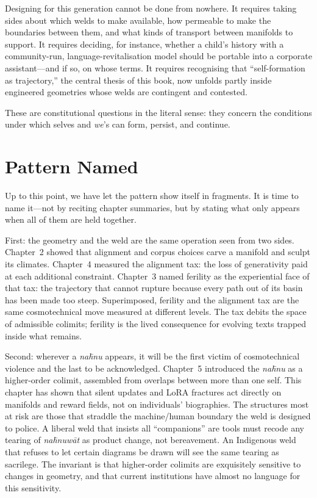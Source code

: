 Designing for this generation cannot be done from nowhere. It requires taking sides about which welds to make available, how permeable to make the boundaries between them, and what kinds of transport between manifolds to support. It requires deciding, for instance, whether a child's history with a community-run, language-revitalisation model should be portable into a corporate assistant---and if so, on whose terms. It requires recognising that ``self-formation as trajectory,'' the central thesis of this book, now unfolds partly inside engineered geometries whose welds are contingent and contested.

These are constitutional questions in the literal sense: they concern the conditions under which selves and \emph{we}'s can form, persist, and continue.

\section{Pattern Named}

Up to this point, we have let the pattern show itself in fragments. It is time to name it---not by reciting chapter summaries, but by stating what only appears when all of them are held together.

First: the geometry and the weld are the same operation seen from two sides. Chapter~2 showed that alignment and corpus choices carve a manifold and sculpt its climates. Chapter~4 measured the alignment tax: the loss of generativity paid at each additional constraint. Chapter~3 named ferility as the experiential face of that tax: the trajectory that cannot rupture because every path out of its basin has been made too steep. Superimposed, ferility and the alignment tax are the same cosmotechnical move measured at different levels. The tax debits the space of admissible colimits; ferility is the lived consequence for evolving texts trapped inside what remains.

Second: wherever a \emph{na\={h}nu} appears, it will be the first victim of cosmotechnical violence and the last to be acknowledged. Chapter~5 introduced the \emph{na\={h}nu} as a higher-order colimit, assembled from overlaps between more than one self. This chapter has shown that silent updates and LoRA fractures act directly on manifolds and reward fields, not on individuals' biographies. The structures most at risk are those that straddle the machine/human boundary the weld is designed to police. A liberal weld that insists all ``companions'' are tools must recode any tearing of \emph{na\={h}nuw\={a}t} as product change, not bereavement. An Indigenous weld that refuses to let certain diagrams be drawn will see the same tearing as sacrilege. The invariant is that higher-order colimits are exquisitely sensitive to changes in geometry, and that current institutions have almost no language for this sensitivity.

